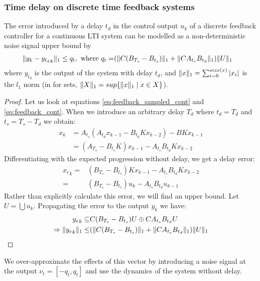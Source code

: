 \documentclass[sigconf]{llncs}
\DeclarePairedDelimiter\norm{\lVert}{\rVert}
\newcommand{\mat}[1]{{#1}}
\renewcommand{\vec}[1]{{#1}}
\begin{document}
\subsubsection{Time delay on discrete time feedback systems} \label{sec:delay}
\begin{theorem}
The error introduced by a delay $t_d$ in the control output $\vec{u}_k$ of a discrete feedback controller for a continuous LTI system can be modelled as a non-deterministic noise signal upper bound by 
\begin{align}
\norm{\vec{y}_{k}-{\vec{y}_{t_d}}_{k}}_1 \leq q_t, \text{ where } q_t=&(\norm{\mat{C}(\mat{B}_{T_s}-\mat{B}_{t_s})}_1+\norm{\mat{C}\mat{A}_{t_s}\mat{B}_{t_d}}_1)\norm{U}_1
\end{align}
where $\vec{y}_{t_d}$ is the output of the system with delay $t_d$, and $\norm{\vec{x}}_1=\sum_{i=0}^{size(\vec{x})} |\vec{x}_i|$ is the $l_1$ norm (in for sets, $\norm{X}_1 = sup \{\norm{\vec{x}}_1 \mid \vec{x} \in X\}$). 
\end{theorem}

\begin{proof}
Let us look at equations \eqref{eq:feedback_sampled_cont} and
\eqref{eq:feedback_cont}.  When we introduce an arbitrary delay $T_d$ where
$t_d=T_d$ and $t_s=T_s-T_d$ we obtain:
%
\begin{align*}
\vec{x}_{k} &=\mat{A}_{t_s}(\mat{A}_{t_d}\vec{x}_{k-1}-\mat{B}_{t_d}\mat{K}\vec{x}_{k-2})-\mat{B}\mat{K}\vec{x}_{k-1}\nonumber\\
&=  (\mat{A}_{T_s}-\mat{B}_{t_s}\mat{K})\vec{x}_{k-1}-\mat{A}_{t_s}\mat{B}_{t_d}\mat{K}\vec{x}_{k-2}
\label{eq:delay_cont}
\end{align*}
%
Differentiating with the expected progression without delay, we get a delay
error:
%
\begin{align*}
{\vec{x}_e}_{k}=&(\mat{B}_{T_s}-\mat{B}_{t_s})\mat{K}\vec{x}_{k-1}-\mat{A}_{t_s}\mat{B}_{t_d}\mat{K}\vec{x}_{k-2}\nonumber\\
=&(\mat{B}_{T_s}-\mat{B}_{t_s})\vec{u}_{k}-\mat{A}_{t_s}\mat{B}_{t_d}\vec{u}_{k-1}
\end{align*}
Rather than explicitly calculate this error, we will find an upper bound. Let $U = \bigcup \vec{u}_k$. Propagating the error to the output $\vec{y}_k$ we have:
\begin{align*}
{\vec{y}_e}_{k} \subseteq &\mat{C}(\mat{B}_{T_s}-\mat{B}_{t_s})U\oplus\mat{C}\mat{A}_{t_s}\mat{B}_{t_d}U\\
\Rightarrow \norm{{\vec{y}_e}_{k}}_1 \leq & (\norm{\mat{C}(\mat{B}_{T_s}-\mat{B}_{t_s})}_1+\norm{\mat{C}\mat{A}_{t_s}\mat{B}_{t_d}}_1)\norm{U}_1
\end{align*}
\end{proof}
We over-approximate the effects of this vector by introducing a noise signal at the output $\nu_t=[-q_t, q_t]$ and use the dynamics of the system without delay.
\end{document}
